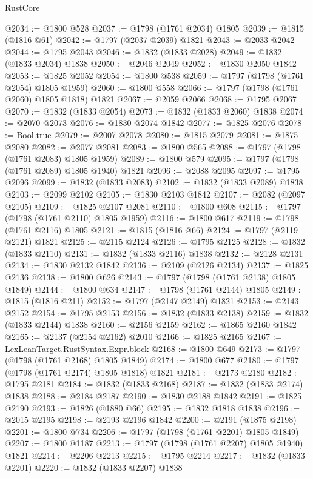\begin{lexlean}{RustCore}
\begin{coremodule}
@2034 := @1800 @528
@2037 := @1798 (@1761 @2034) @1805
@2039 := @1815 (@1816 @61)
@2042 := @1797 (@2037 @2039) @1821
@2043 := @2033 @2042
@2044 := @1795 @2043
@2046 := @1832 (@1833 @2028)
@2049 := @1832 (@1833 @2034) @1838
@2050 := @2046 @2049
@2052 := @1830 @2050 @1842
@2053 := @1825 @2052
@2054 := @1800 @538
@2059 := @1797 (@1798 (@1761 @2054) @1805 @1959)
@2060 := @1800 @558
@2066 := @1797 (@1798 (@1761 @2060) @1805 @1818) @1821
@2067 := @2059 @2066
@2068 := @1795 @2067
@2070 := @1832 (@1833 @2054)
@2073 := @1832 (@1833 @2060) @1838
@2074 := @2070 @2073
@2076 := @1830 @2074 @1842
@2077 := @1825 @2076
@2078 := Bool.true
@2079 := @2007 @2078
@2080 := @1815 @2079
@2081 := @1875 @2080
@2082 := @2077 @2081
@2083 := @1800 @565
@2088 := @1797 (@1798 (@1761 @2083) @1805 @1959)
@2089 := @1800 @579
@2095 := @1797 (@1798 (@1761 @2089) @1805 @1940) @1821
@2096 := @2088 @2095
@2097 := @1795 @2096
@2099 := @1832 (@1833 @2083)
@2102 := @1832 (@1833 @2089) @1838
@2103 := @2099 @2102
@2105 := @1830 @2103 @1842
@2107 := @2082 (@2097 @2105)
@2109 := @1825 @2107 @2081
@2110 := @1800 @608
@2115 := @1797 (@1798 (@1761 @2110) @1805 @1959)
@2116 := @1800 @617
@2119 := @1798 (@1761 @2116) @1805
@2121 := @1815 (@1816 @66)
@2124 := @1797 (@2119 @2121) @1821
@2125 := @2115 @2124
@2126 := @1795 @2125
@2128 := @1832 (@1833 @2110)
@2131 := @1832 (@1833 @2116) @1838
@2132 := @2128 @2131
@2134 := @1830 @2132 @1842
@2136 := @2109 (@2126 @2134)
@2137 := @1825 @2136
@2138 := @1800 @626
@2143 := @1797 (@1798 (@1761 @2138) @1805 @1849)
@2144 := @1800 @634
@2147 := @1798 (@1761 @2144) @1805
@2149 := @1815 (@1816 @211)
@2152 := @1797 (@2147 @2149) @1821
@2153 := @2143 @2152
@2154 := @1795 @2153
@2156 := @1832 (@1833 @2138)
@2159 := @1832 (@1833 @2144) @1838
@2160 := @2156 @2159
@2162 := @1865 @2160 @1842
@2165 := @2137 (@2154 @2162) @2010
@2166 := @1825 @2165
@2167 := LexLeanTarget.RustSyntax.Expr.block
@2168 := @1800 @649
@2173 := @1797 (@1798 (@1761 @2168) @1805 @1849)
@2174 := @1800 @677
@2180 := @1797 (@1798 (@1761 @2174) @1805 @1818) @1821
@2181 := @2173 @2180
@2182 := @1795 @2181
@2184 := @1832 (@1833 @2168)
@2187 := @1832 (@1833 @2174) @1838
@2188 := @2184 @2187
@2190 := @1830 @2188 @1842
@2191 := @1825 @2190
@2193 := @1826 (@1880 @66)
@2195 := @1832 @1818 @1838
@2196 := @2015 @2195
@2198 := @2193 @2196 @1842
@2200 := @2191 (@1875 @2198)
@2201 := @1800 @734
@2206 := @1797 (@1798 (@1761 @2201) @1805 @1849)
@2207 := @1800 @1187
@2213 := @1797 (@1798 (@1761 @2207) @1805 @1940) @1821
@2214 := @2206 @2213
@2215 := @1795 @2214
@2217 := @1832 (@1833 @2201)
@2220 := @1832 (@1833 @2207) @1838

\end{coremodule}
\end{lexlean}
